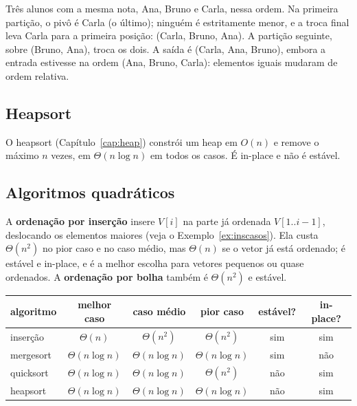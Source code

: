 \begin{exemplo}\label{ex:quickinst}
Três alunos com a mesma nota, Ana, Bruno e Carla, nessa ordem. Na primeira partição, o pivô é Carla (o último); ninguém é estritamente menor, e a troca final leva Carla para a primeira posição: (Carla, Bruno, Ana). A partição seguinte, sobre (Bruno, Ana), troca os dois. A saída é (Carla, Ana, Bruno), embora a entrada estivesse na ordem (Ana, Bruno, Carla): elementos iguais mudaram de ordem relativa.
\end{exemplo}

\subsection*{Heapsort}
O heapsort (Capítulo~\ref{cap:heap}) constrói um heap em $O(n)$ e remove o máximo $n$ vezes, em $\Theta(n\log n)$ em todos os casos. É in-place e não é estável.

\subsection*{Algoritmos quadráticos}
A \textbf{ordenação por inserção} insere $V[i]$ na parte já ordenada $V[1..i-1]$, deslocando os elementos maiores (veja o Exemplo~\ref{ex:inscasos}). Ela custa $\Theta(n^2)$ no pior caso e no caso médio, mas $\Theta(n)$ se o vetor já está ordenado; é estável e in-place, e é a melhor escolha para vetores pequenos ou quase ordenados. A \textbf{ordenação por bolha} também é $\Theta(n^2)$ e estável.

\begin{center}\small
\begin{tabular}{@{}lccccc@{}}
\toprule
algoritmo & melhor caso & caso médio & pior caso & estável? & in-place?\\
\midrule
inserção & $\Theta(n)$ & $\Theta(n^2)$ & $\Theta(n^2)$ & sim & sim\\
mergesort & $\Theta(n\log n)$ & $\Theta(n\log n)$ & $\Theta(n\log n)$ & sim & não\\
quicksort & $\Theta(n\log n)$ & $\Theta(n\log n)$ & $\Theta(n^2)$ & não & sim\\
heapsort & $\Theta(n\log n)$ & $\Theta(n\log n)$ & $\Theta(n\log n)$ & não & sim\\
\bottomrule
\end{tabular}
\end{center}

